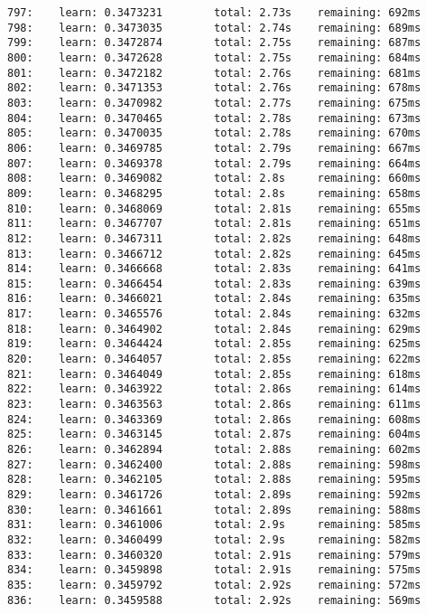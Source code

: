 \documentclass[11pt]{article}
\begin{document}
\begin{Verbatim}[commandchars=\\\{\}]
797:    learn: 0.3473231        total: 2.73s    remaining: 692ms
798:    learn: 0.3473035        total: 2.74s    remaining: 689ms
799:    learn: 0.3472874        total: 2.75s    remaining: 687ms
800:    learn: 0.3472628        total: 2.75s    remaining: 684ms
801:    learn: 0.3472182        total: 2.76s    remaining: 681ms
802:    learn: 0.3471353        total: 2.76s    remaining: 678ms
803:    learn: 0.3470982        total: 2.77s    remaining: 675ms
804:    learn: 0.3470465        total: 2.78s    remaining: 673ms
805:    learn: 0.3470035        total: 2.78s    remaining: 670ms
806:    learn: 0.3469785        total: 2.79s    remaining: 667ms
807:    learn: 0.3469378        total: 2.79s    remaining: 664ms
808:    learn: 0.3469082        total: 2.8s     remaining: 660ms
809:    learn: 0.3468295        total: 2.8s     remaining: 658ms
810:    learn: 0.3468069        total: 2.81s    remaining: 655ms
811:    learn: 0.3467707        total: 2.81s    remaining: 651ms
812:    learn: 0.3467311        total: 2.82s    remaining: 648ms
813:    learn: 0.3466712        total: 2.82s    remaining: 645ms
814:    learn: 0.3466668        total: 2.83s    remaining: 641ms
815:    learn: 0.3466454        total: 2.83s    remaining: 639ms
816:    learn: 0.3466021        total: 2.84s    remaining: 635ms
817:    learn: 0.3465576        total: 2.84s    remaining: 632ms
818:    learn: 0.3464902        total: 2.84s    remaining: 629ms
819:    learn: 0.3464424        total: 2.85s    remaining: 625ms
820:    learn: 0.3464057        total: 2.85s    remaining: 622ms
821:    learn: 0.3464049        total: 2.85s    remaining: 618ms
822:    learn: 0.3463922        total: 2.86s    remaining: 614ms
823:    learn: 0.3463563        total: 2.86s    remaining: 611ms
824:    learn: 0.3463369        total: 2.86s    remaining: 608ms
825:    learn: 0.3463145        total: 2.87s    remaining: 604ms
826:    learn: 0.3462894        total: 2.88s    remaining: 602ms
827:    learn: 0.3462400        total: 2.88s    remaining: 598ms
828:    learn: 0.3462105        total: 2.88s    remaining: 595ms
829:    learn: 0.3461726        total: 2.89s    remaining: 592ms
830:    learn: 0.3461661        total: 2.89s    remaining: 588ms
831:    learn: 0.3461006        total: 2.9s     remaining: 585ms
832:    learn: 0.3460499        total: 2.9s     remaining: 582ms
833:    learn: 0.3460320        total: 2.91s    remaining: 579ms
834:    learn: 0.3459898        total: 2.91s    remaining: 575ms
835:    learn: 0.3459792        total: 2.92s    remaining: 572ms
836:    learn: 0.3459588        total: 2.92s    remaining: 569ms

\end{Verbatim}
\end{document}
